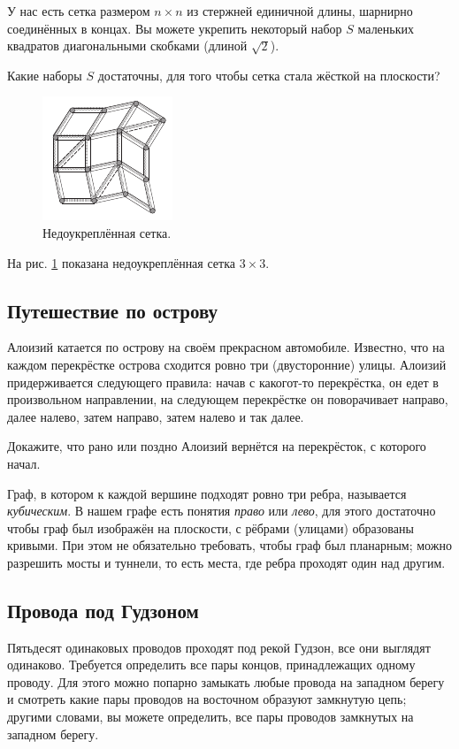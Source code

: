 У нас есть сетка размером $n \times n$ из стержней единичной длины, шарнирно соединённых в концах.
Вы можете укрепить некоторый набор $S$ маленьких квадратов диагональными скобками (длиной $\sqrt{2}$).

Какие наборы $S$ достаточны, для того чтобы сетка стала жёсткой на плоскости?

\begin{figure}[ht!]
\centering
\includegraphics[scale=1]{pics/lattice1}
\caption{Недоукреплённая сетка.}
\label{pic:lattice1}
\end{figure}

На рис. \ref{pic:lattice1} показана недоукреплённая сетка $3 \times 3$.

\subsection*{Путешествие по острову}

Алоизий катается по острову на своём прекрасном автомобиле.
Известно, что на каждом перекрёстке острова сходится ровно три (двусторонние) улицы.
Алоизий придерживается следующего правила:
начав с какогот-то перекрёстка, он едет в произвольном направлении, на следующем перекрёстке он поворачивает направо, далее налево, затем направо, затем налево и так далее.

Докажите, что рано или поздно Алоизий вернётся на перекрёсток, с которого начал.

 Граф, в котором к каждой вершине подходят ровно три ребра, называется \emph{кубическим}.
В нашем графе есть понятия \emph{право} или \emph{лево},
для этого достаточно чтобы граф был изображён на плоскости, с рёбрами (улицами) образованы кривыми.
При этом не обязательно требовать, чтобы граф был планарным;
можно разрешить мосты и туннели, то есть места, где ребра проходят один над другим.

\subsection*{Провода под Гудзоном}

Пятьдесят одинаковых проводов проходят под рекой Гудзон, все они выглядят одинаково.
Требуется определить все пары концов, принадлежащих одному проводу.
Для этого можно попарно замыкать любые провода на западном берегу и смотреть какие пары проводов на восточном образуют замкнутую цепь;
другими словами, вы можете определить, все пары проводов замкнутых на западном берегу.

